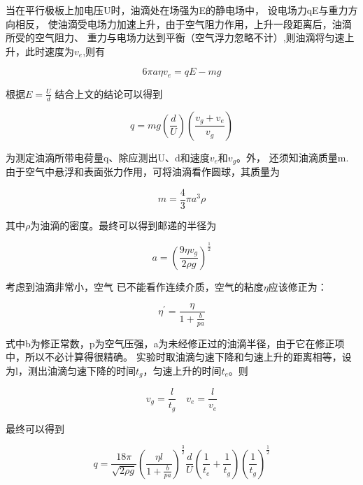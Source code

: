 \documentclass{ctexart}
\begin{document}
  当在平行极板上加电压U时，油滴处在场强为E的静电场中，
  设电场力qE与重力方向相反，
  使油滴受电场力加速上升，由于空气阻力作用，上升一段距离后，油滴所受的空气阻力、
  重力与电场力达到平衡（空气浮力忽略不计）,则油滴将匀速上升，此时速度为$v_{e}$,则有

  \begin{equation}
    6 \pi a \eta v_{e} = qE - mg
  \end{equation}

  根据$E = \frac{U}{d}$ 结合上文的结论可以得到

  \begin{equation}
    q = mg (\frac{d}{U}) (\frac{v_{g}+v_{e}}{v_{g}})
  \end{equation}

  为测定油滴所带电荷量q、除应测出U、d和速度$v_{e}$和$v_{g}$。外，
  还须知油滴质量m.由于空气中悬浮和表面张力作用，可将油滴看作圆球，其质量为

  \begin{equation}
    m = \frac{4}{3} \pi a^{3} \rho
  \end{equation}

  其中$\rho$为油滴的密度。最终可以得到邮递的半径为

  \begin{equation}
    a = ( \frac{9\eta v_{g}}{2\rho g} )^{\frac{1}{2}}
  \end{equation}

  考虑到油滴非常小，空气 已不能看作连续介质，空气的粘度$\eta$应该修正为：
  
  \begin{equation}
    \eta^{'} = \frac{\eta}{1+ \frac{b}{pa} }
  \end{equation}

  式中b为修正常数，p为空气压强，a为未经修正过的油滴半径，由于它在修正项
  中，所以不必计算得很精确。
  实验时取油滴匀速下降和匀速上升的距离相等，设为l，测出油滴匀速下降的时间$t_{g}$，匀速上升的时间$t_{e}$。则
  
  \begin{equation}
    v_{g} = \frac{l}{t_{g}} \quad v_{e}=\frac{l}{v_{e}}
  \end{equation}

  最终可以得到

  \begin{equation}
    q = \frac{18\pi}{\sqrt{2\rho g}} (\frac{\eta l}{1+ \frac{b}{pa} })^{\frac{3}{2}} \frac{d}{U} (\frac{1}{t_{e}} + \frac{1}{t_{g}}) (\frac{1}{t_{g}})^{\frac{1}{2}}
  \end{equation}
\end{document}
